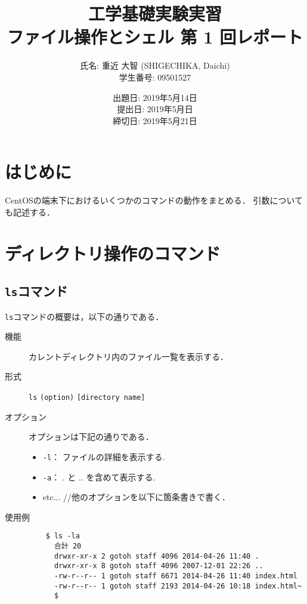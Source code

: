 \documentclass[a4j,11pt]{jarticle}
\title{工学基礎実験実習 \\
       ファイル操作とシェル 第 1 回レポート}
\author{氏名: 重近 大智 (SHIGECHIKA, Daichi) \\
        学生番号: 09501527}
\date{出題日: 2019年5月14日 \\
      提出日: 2019年5月日 \\
      締切日: 2019年5月21日 \\}  %
\begin{document}
\maketitle

\section{はじめに}
CentOSの端末下におけるいくつかのコマンドの動作をまとめる．
引数についても記述する．
\section{ディレクトリ操作のコマンド}

\subsection{\texttt{ls}コマンド}

\verb|ls|コマンドの概要は，以下の通りである．
\begin{description}
  \item[機能] %
    カレントディレクトリ内のファイル一覧を表示する．
  \item[形式] %
    \verb|ls| \verb|(option)| \verb|[directory name]|
  \item[オプション] %
    オプションは下記の通りである．
    \begin{itemize}
      \item \verb|-l|：  ファイルの詳細を表示する.
      \item \verb|-a|：  . と .. を含めて表示する.
      \item etc... //他のオプションを以下に箇条書きで書く．
    \end{itemize}
  \item[使用例] %
    \begin{verbatim}
    $ ls -la
      合計 20
      drwxr-xr-x 2 gotoh staff 4096 2014-04-26 11:40 .
      drwxr-xr-x 8 gotoh staff 4096 2007-12-01 22:26 ..
      -rw-r--r-- 1 gotoh staff 6671 2014-04-26 11:40 index.html
      -rw-r--r-- 1 gotoh staff 2193 2014-04-26 10:18 index.html~
      $
    \end{verbatim}
\end{description}
\end{document}
